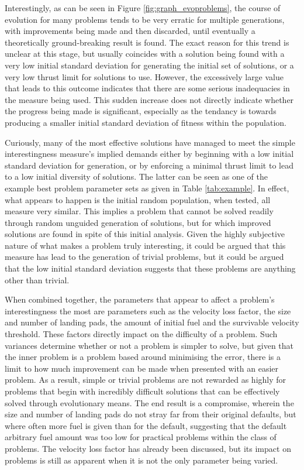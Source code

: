 \documentclass[conference]{IEEEtran}
\begin{document}
Interestingly, as can be seen in Figure \ref{fig:graph_evoproblems}, the course of evolution for many problems tends to be very erratic for multiple generations, with improvements being made and then discarded, until eventually a theoretically ground-breaking result is found. The exact reason for this trend is unclear at this stage, but usually coincides with a solution being found with a very low initial standard deviation for generating the initial set of solutions, or a very low thrust limit for solutions to use. However, the excessively large value that leads to this outcome indicates that there are some serious inadequacies in the measure being used. This sudden increase does not directly indicate whether the progress being made is significant, especially as the tendancy is towards producing a smaller initial standard deviation of fitness within the population.

Curiously, many of the most effective solutions have managed to meet the simple interestingness measure's implied demands either by beginning with a low initial standard deviation for generation, or by enforcing a minimal thrust limit to lead to a low initial diversity of solutions. The latter can be seen as one of the example best problem parameter sets as given in Table \ref{tab:example}. In effect, what appears to happen is the initial random population, when tested, all measure very similar. This implies a problem that cannot be solved readily through random unguided generation of solutions, but for which improved solutions are found in spite of this initial analysis. Given the highly subjective nature of what makes a problem truly interesting, it could be argued that this measure has lead to the generation of trivial problems, but it could be argued that the low initial standard deviation suggests that these problems are anything other than trivial.

When combined together, the parameters that appear to affect a problem's interestingness the most are parameters such as the velocity loss factor, the size and number of landing pads, the amount of initial fuel and the survivable velocity threshold. These factors directly impact on the difficulty of a problem. Such variances determine whether or not a problem is simpler to solve, but given that the inner problem is a problem based around minimising the error, there is a limit to how much improvement can be made when presented with an easier problem. As a result, simple or trivial problems are not rewarded as highly for problems that begin with incredibly difficult solutions that can be effectively solved through evolutionary means. The end result is a compromise, wherein the size and number of landing pads do not stray far from their original defaults, but where often more fuel is given than for the default, suggesting that the default arbitrary fuel amount was too low for practical problems within the class of problems. The velocity loss factor has already been discussed, but its impact on problems is still as apparent when it is not the only parameter being varied.
\end{document}
